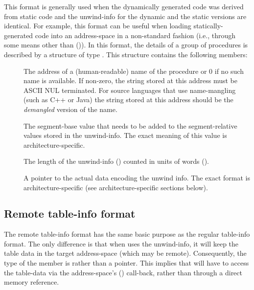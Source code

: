 \documentclass{article}
\begin{document}
This format is generally used when the dynamically generated code was
derived from static code and the unwind-info for the dynamic and the
static versions are identical.  For example, this format can be useful
when loading statically-generated code into an address-space in a
non-standard fashion (i.e., through some means other than
()).  In this format, the details of a group of procedures
is described by a structure of type .
This structure contains the following members:
\begin{description}

\item[ ] The address of a
  (human-readable) name of the procedure or 0 if no such name is
  available.  If non-zero, the string stored at this address must be
  ASCII NUL terminated.  For source languages that use name-mangling
  (such as C++ or Java) the string stored at this address should be
  the \emph{demangled} version of the name.

\item[ ] The segment-base value
  that needs to be added to the segment-relative values stored in the
  unwind-info.  The exact meaning of this value is
  architecture-specific.

\item[ ] The length of the
  unwind-info () counted in units of words
  ().

\item[ ] A pointer to the actual
  data encoding the unwind info.  The exact format is
  architecture-specific (see architecture-specific sections below).

\end{description}

\subsection{Remote table-info format}

The remote table-info format has the same basic purpose as the regular
table-info format.  The only difference is that when 
uses the unwind-info, it will keep the table data in the target
address-space (which may be remote).  Consequently, the type of the
 member is  rather than a pointer.
This implies that  will have to access the table-data
via the address-space's () call-back, rather than
through a direct memory reference.
\end{document}
